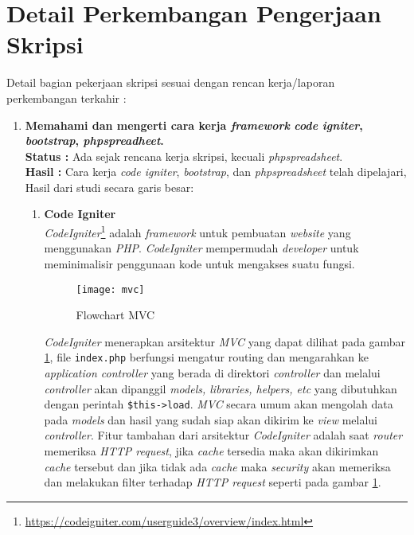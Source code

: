 \documentclass[a4paper,twoside]{article}
\begin{document}
\section{Detail Perkembangan Pengerjaan Skripsi}
Detail bagian pekerjaan skripsi sesuai dengan rencan kerja/laporan perkembangan terkahir :

\begin{enumerate}
	\item \textbf{Memahami dan mengerti cara kerja \textit{framework} \textit{code igniter}, \textit{bootstrap}, \textit{phpspreadheet}.}\\
	{\bf Status :} Ada sejak rencana kerja skripsi, kecuali \textit{phpspreadsheet}.\\
	{\bf Hasil :} Cara kerja \textit{code igniter}, \textit{bootstrap}, dan \textit{phpspreadsheet} telah dipelajari, Hasil dari studi secara garis besar:
	\begin{enumerate}
		\item \textbf{Code Igniter} \\
		\textit{CodeIgniter}\footnote{\url{https://codeigniter.com/userguide3/overview/index.html}} adalah \textit{framework} untuk pembuatan \textit{website} yang menggunakan \textit{PHP}. \textit{CodeIgniter} mempermudah \textit{developer} untuk meminimalisir penggunaan kode untuk mengakses suatu fungsi.
		
		\begin{figure}[H]
			\centering
			\texttt{[image: mvc]} 
			\caption{Flowchart MVC}
			\label{fig:appflowchart} 
		\end{figure}
				
		 \textit{CodeIgniter} menerapkan arsitektur \textit{MVC} yang dapat dilihat pada gambar \ref{fig:appflowchart}, file \texttt{index.php} berfungsi mengatur routing dan mengarahkan ke \textit{application controller} yang berada di direktori \textit{controller} dan melalui \textit{controller} akan dipanggil \textit{models, libraries, helpers, etc} yang dibutuhkan dengan perintah \texttt{\$this->load}. \textit{MVC} secara umum akan mengolah data pada \textit{models} dan hasil yang sudah siap akan dikirim ke \textit{view} melalui \textit{controller}. Fitur tambahan dari arsitektur \textit{CodeIgniter} adalah saat \textit{router} memeriksa \textit{HTTP request}, jika \textit{cache} tersedia maka akan dikirimkan \textit{cache} tersebut dan jika tidak ada \textit{cache} maka \textit{security} akan memeriksa dan melakukan filter terhadap \textit{HTTP request} seperti pada gambar \ref{fig:appflowchart}. 
		 

\end{enumerate}
\end{enumerate}
\end{document}
